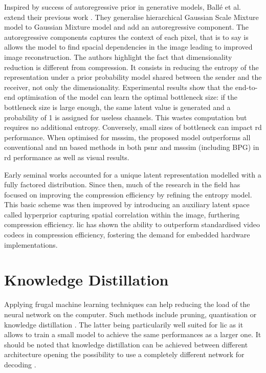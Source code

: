 Inspired by success of autoregressive prior in generative models, Ballé et al. extend their previous work \cite{minnen2018jointautoregressivehierarchicalpriors}. They generalise hierarchical Gaussian Scale Mixture model to Gaussian Mixture model and add an autoregressive component. The autoregressive components captures the context of each pixel, that is to say is allows the model to find spacial dependencies in the image leading to improved image reconstruction. The authors highlight the fact that dimensionality reduction is different from compression. It consists in reducing the entropy of the representation under a prior probability model shared between the sender and the receiver, not only the dimensionality. Experimental results show that the end-to-end optimisation of the model can learn the optimal bottleneck size: if the bottleneck size is large enough, the same latent value is generated and a probability of 1 is assigned for useless channels. This wastes computation but requires no additional entropy. Conversely, small sizes of bottleneck can impact \acrshort{rd} performance. When optimised for \acrshort{msssim}, the proposed model outperforms all conventional and \acrshort{nn} based methods in both \acrshort{psnr} and \acrshort{msssim} (including BPG) in \acrshort{rd} performance as well as visual results.

Early seminal works accounted for a unique latent representation modelled with a fully factored distribution. Since then, much of the research in the field has focused on improving the compression efficiency by refining the entropy model. This basic scheme was then improved by introducing an auxiliary latent space called hyperprior capturing spatial correlation within the image, furthering compression efficiency. \acrshort{lic} has shown the ability to outperform standardised video codecs in compression efficiency, fostering the demand for embedded hardware implementations.

\section{Knowledge Distillation}
Applying frugal machine learning techniques can help reducing the load of the neural network on the computer. Such methods include pruning, quantisation or knowledge distillation \cite{touvron2021trainingdataefficientimagetransformers}. The latter being particularily well suited for \acrshort{lic} as it allows to train a small model to achieve the same performances as a larger one. It should be noted that knowledge distillation can be achieved between different architecture opening the possibility to use a completely different network for decoding \cite{liu2022crossarchitectureknowledgedistillation}.

